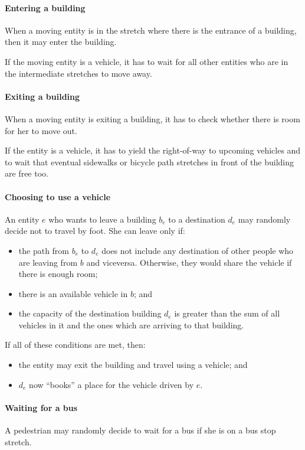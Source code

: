 \paragraph{Entering a building} When a moving entity is in the stretch where
there is the entrance of a building, then it may enter the building.

If the moving entity is a vehicle, it has to wait for all other entities who
are in the intermediate stretches to move away.

\paragraph{Exiting a building} When a moving entity is exiting a building, it
has to check whether there is room for her to move out.

If the entity is a vehicle, it has to yield the right-of-way to upcoming
vehicles and to wait that eventual sidewalks or bicycle path stretches in front
of the building are free too.

\paragraph{Choosing to use a vehicle} An entity $e$ who wants to leave a
building $b_e$ to a destination $d_e$ may randomly decide not to travel by
foot. She can leave only if:

\begin{itemize}
  \item the path from $b_e$ to $d_e$ does not include any destination of other
    people who are leaving from $b$ and viceversa. Otherwise, they would share
    the vehicle if there is enough room;
  \item there is an available vehicle in $b$; and
  \item the capacity of the destination building $d_e$ is greater than the sum
    of all vehicles in it and the ones which are arriving to that building.
\end{itemize}

If all of these conditions are met, then:
\begin{itemize}
  \item the entity may exit the building and travel using a vehicle; and
  \item $d_e$ now ``books'' a place for the vehicle driven by $e$.
\end{itemize}

\paragraph{Waiting for a bus} A pedestrian may randomly decide to wait for a
bus if she is on a bus stop stretch.

